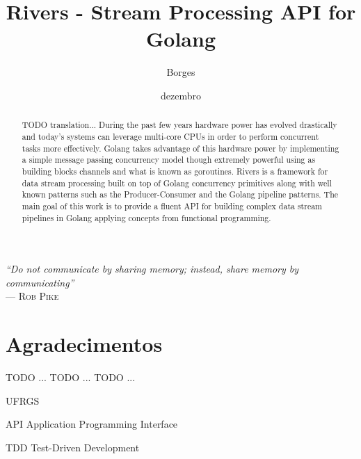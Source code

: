 \documentclass[tc]{iiufrgs}
\title{Rivers - Stream Processing API for Golang}
\author{Borges}{Diego}
\date{dezembro}{2015}
\begin{document}
\maketitle

\clearpage
\begin{flushright}
\mbox{}\vfill
{\sffamily\itshape
``Do not communicate by sharing memory; instead, share memory by communicating''\\}
--- \textsc{Rob Pike}
\end{flushright}

\chapter*{Agradecimentos}
\label{cha:thanks}
TODO ...
TODO ...
TODO ...

%
%

\tableofcontents

\begin{listofabbrv}{UFRGS}
        \item[API] Application Programming Interface
        \item[TDD] Test-Driven Development
\end{listofabbrv}

\listoffigures

\listoftables

\begin{abstract}
TODO translation...
During the past few years hardware power has evolved drastically and today's systems can leverage multi-core CPUs in order to perform concurrent tasks more effectively.
Golang takes advantage of this hardware power by implementing a simple message passing concurrency model though extremely powerful using as building blocks channels and what is known as goroutines.
Rivers is a framework for data stream processing built on top of Golang concurrency primitives along with well known patterns such as the Producer-Consumer and the Golang pipeline patterns.
The main goal of this work is to provide a fluent API for building complex data stream pipelines in Golang applying concepts from functional programming.
\end{abstract}
\end{document}
